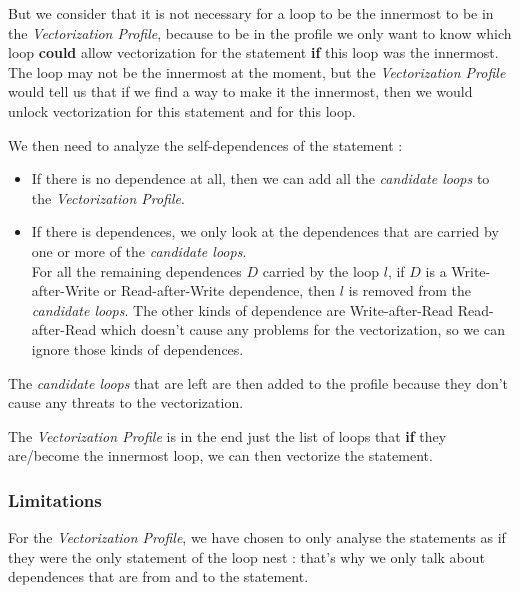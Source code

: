 \documentclass[paper=a4, fontsize=11.5pt]{scrartcl}
\numberwithin{equation}{section}        %
\numberwithin{figure}{section}          %
\numberwithin{table}{section}               %
\begin{document}
        But we consider that it is not necessary for a loop to be the innermost to be
        in the \textit{Vectorization Profile}, because to be in the profile
        we only want to know which loop \textbf{could} allow vectorization
        for the statement \textbf{if} this loop was the innermost. The loop may not be
        the innermost at the moment, but the \textit{Vectorization Profile} would tell
        us that if we find a way to make it the innermost, then we would unlock vectorization
        for this statement and for this loop.

        \bigskip

        We then need to analyze the \glspl{self-dependence} of the statement :
        \begin{itemize}
            \item If there is no dependence at all, then we can add all the 
                \textit{candidate loops} to the \textit{Vectorization Profile}.
            \item If there is dependences, we only look at the dependences that
                are carried by one or more of the \textit{candidate loops}.\\
                For all the remaining dependences $D$ carried by the loop $l$,
                if $D$ is a Write-after-Write or Read-after-Write dependence, then $l$
                is removed from the \textit{candidate loops}.
                The other kinds of dependence are Write-after-Read Read-after-Read 
                which doesn't cause any problems for the vectorization, so we can ignore
                those kinds of dependences.
        \end{itemize}
        The \textit{candidate loops} that are left are then added to the profile because they
        don't cause any threats to the vectorization.

        \bigskip

        The \textit{Vectorization Profile} is in the end just the list of loops that
        \textbf{if} they are/become the innermost loop, we can then vectorize the statement.

        \subsubsection{Limitations}
        For the \textit{Vectorization Profile}, we have chosen to only analyse the statements
        as if they were the only statement of the loop nest : that's why we only talk
        about dependences that are from and to the statement.
\end{document}
